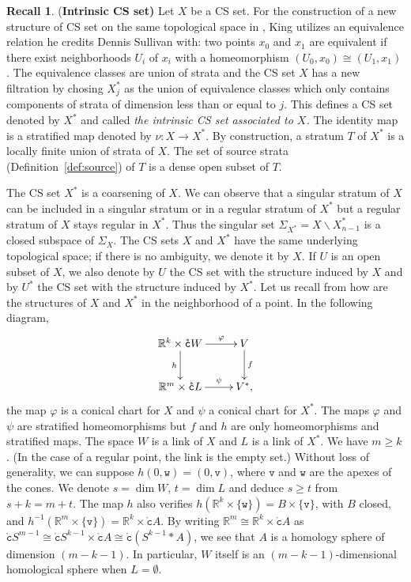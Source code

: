 \documentclass[a4paper,10pt,english,reqno]{amsart}
\theoremstyle{plain}
\theoremstyle{definition}
\newtheorem{recall}[proposition]{Recall}
\theoremstyle{remark}
\numberwithin{equation}{section}
\newcommand{\defref}[1]{Definition~\ref{#1}}
\def\R{{\mathbb R}}
\def\tc{{\mathtt c}}
\def\tv{{\mathtt v}}
\def\tw{{\mathtt w}}
\def\R{\mathbb{R}}
\def\rc{{\mathring{\tc}}}
\def\menos{\backslash}
\renewcommand\1{\hbox{\ding{192}}}
\renewcommand\2{\hbox{\ding{193}}}
\newcommand\3{\hbox{\ding{194}}}
\newcommand\4{\hbox{\ding{195}}}
\begin{document}
\medskip
\begin{recall}\label{rec:intrinsic}{(\bf{Intrinsic CS set})}
Let $X$ be a CS set. For the construction of a new structure of CS set on the same topological space in \cite{MR800845}, 
%
King utilizes an equivalence relation he credits Dennis Sullivan with: two points $x_{0}$ and $x_{1}$ are equivalent if there exist neighborhoods $U_{i}$ of $x_{i}$ with a homeomorphism $(U_{0},x_{0})\cong (U_{1},x_{1})$. 
The equivalence classes are union of strata and the CS set $X$ has a new filtration by chosing $X_{j}^*$ as the
union of equivalence classes which only contains components of strata of dimension less than or equal to $j$.
This defines a CS set denoted by $X^*$ and called \emph{the intrinsic CS set associated to  $X$.}
The identity map  is a stratified map   denoted by $\nu\colon X\to X^*$.
By construction, a stratum $T$ of $X^*$ is a locally finite union of strata of $X$. 
%
The set of source strata (\defref{def:source}) of $T$ is a dense open subset of $T$.


The CS set $X^*$ is a coarsening of $X$. We can observe that a singular stratum of $X$ can be included in a singular stratum or in a regular stratum of $X^*$ but a regular stratum of $X$ stays regular in $X^*$. 
Thus  the singular set $\Sigma_{X^*}=X\menos X^*_{n-1}$ is a closed subspace of $\Sigma_{X}$.
% 
The CS sets $X$ and $X^*$ have the same underlying topological space; if there is no ambiguity, we denote it by $X$.
If $U$ is an open subset of $X$, we also denote by $U$ the CS set with the structure induced by $X$
and by $U^*$ the CS set with the structure induced by $X^*$. 
Let us recall from \cite{MR800845} how are the  structures of $X$ and $X^*$ in the neighborhood of a point.
In the following diagram,
%
\begin{equation}\label{equa:XandX}
\xymatrix{
\R^k\times \rc W\ar[r]^-{\varphi}\ar[d]_-{h}&
V\ar[d]^-{f}\\
%
\R^m\times\rc L  \ar[r]^-{\psi}&
V^*,
}\end{equation}
%
the map $\varphi$ is a conical chart for $X$ and $\psi$ a conical chart for $X^*$.
%
The maps $\varphi$ and $\psi$ are stratified homeomorphisms but $f$ and $h$ are only
homeomorphisms and stratified maps.
The space $W$ is a link of $X$ and  $L$ is a link of $X^*$. We have  $m\geq k$. 
(In the case of a regular point, the link is the empty set.)
Without loss of generality, we can suppose $h(0,\tw)=(0,\tv)$, where $\tv$ and $\tw$ are the apexes of the cones.
We denote $s=\dim W$, $t=\dim L$ and deduce $s\geq t$ from $s+k=m+t$. 
%
The map $h$ also verifies $h(\R^k\times \{\tw\})=B\times \{\tv\}$, with $B$ closed, and
$h^{-1}(\R^m\times \{\tv\})=\R^k\times \rc A$. 
By writing $\R^m\cong \R^k\times \rc A$ as
$\rc S^{m-1}\cong \rc S^{k-1}\times \rc A\cong \rc(S^{k-1}*A)$, we see that
$A$ is a   homology  sphere of dimension $(m-k-1)$. 
In particular, $W$ itself is an $(m-k-1)$-dimensional homological sphere when $L=\emptyset$.
\end{recall}
\end{document}
